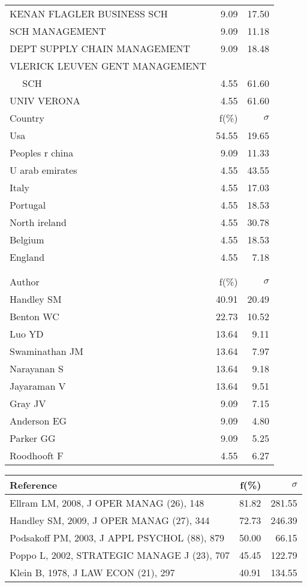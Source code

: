 \documentclass[a4paper,11pt]{report}
\begin{document}
\begin{landscape}
\begin{table}[!ht]
{\begin{tabular}{|l r r|}
KENAN FLAGLER BUSINESS SCH & 9.09 & 17.50\\
SCH MANAGEMENT & 9.09 & 11.18\\
DEPT SUPPLY CHAIN MANAGEMENT & 9.09 & 18.48\\
VLERICK LEUVEN GENT MANAGEMENT &  & \\
$\quad$ SCH & 4.55 & 61.60\\
UNIV VERONA & 4.55 & 61.60\\
\hline
\hline
Country & f(\%) & $\sigma$\\
\hline
Usa & 54.55 & 19.65\\
Peoples r china & 9.09 & 11.33\\
U arab emirates & 4.55 & 43.55\\
Italy & 4.55 & 17.03\\
Portugal & 4.55 & 18.53\\
North ireland & 4.55 & 30.78\\
Belgium & 4.55 & 18.53\\
England & 4.55 & 7.18\\
 &  & \\
 &  & \\
\hline
\hline
Author & f(\%) & $\sigma$\\
\hline
Handley SM & 40.91 & 20.49\\
Benton WC & 22.73 & 10.52\\
Luo YD & 13.64 & 9.11\\
Swaminathan JM & 13.64 & 7.97\\
Narayanan S & 13.64 & 9.18\\
Jayaraman V & 13.64 & 9.51\\
Gray JV & 9.09 & 7.15\\
Anderson EG & 9.09 & 4.80\\
Parker GG & 9.09 & 5.25\\
Roodhooft F & 4.55 & 6.27\\
\hline
\end{tabular}
}
{\scriptsize\begin{tabular}{|l r r|}
\hline
Reference & f(\%) & $\sigma$\\
\hline
Ellram LM, 2008, J OPER MANAG (26), 148 & 81.82 & 281.55\\
Handley SM, 2009, J OPER MANAG (27), 344 & 72.73 & 246.39\\
Podsakoff PM, 2003, J APPL PSYCHOL (88), 879 & 50.00 & 66.15\\
Poppo L, 2002, STRATEGIC MANAGE J (23), 707 & 45.45 & 122.79\\
Klein B, 1978, J LAW ECON (21), 297 & 40.91 & 134.55\\

\end{tabular}}
\end{table}
\end{landscape}
\end{document}
